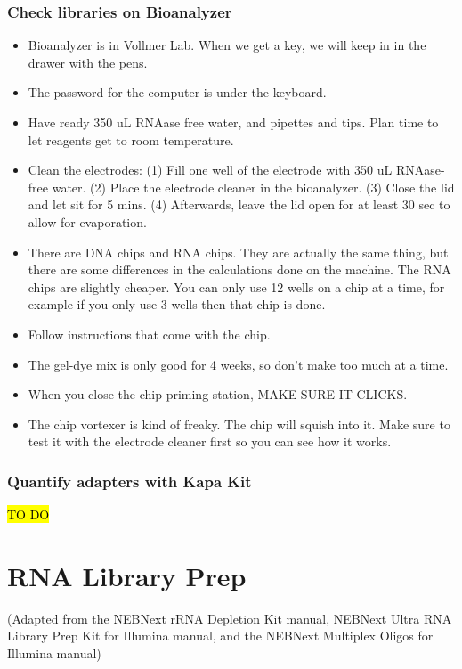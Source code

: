 \documentclass[11pt, oneside]{article}
\begin{document}
\subsubsection{Check libraries on Bioanalyzer}
	\begin{itemize}
		\item Bioanalyzer is in Vollmer Lab.  When we get a key, we will keep in in the drawer with the pens.
		\item The password for the computer is under the keyboard.
		\item Have ready 350 uL RNAase free water, and pipettes and tips.  Plan time to let reagents get to room temperature.
		\item Clean the electrodes: (1) Fill one well of the electrode with 350 uL RNAase-free water. (2) Place the electrode cleaner in the bioanalyzer. (3) Close the lid and let sit for 5 mins. (4) Afterwards, leave the lid open for at least 30 sec to allow for evaporation.
		\item There are DNA chips and RNA chips. They are actually the same thing, but there are some differences in the calculations done on the machine.  The RNA chips are slightly cheaper.  You can only use 12 wells on a chip at a time, for example if you only use 3 wells then that chip is done.
		\item Follow instructions that come with the chip.
		\item	The gel-dye mix is only good for 4 weeks, so don't make too much at a time.
		\item When you close the chip priming station, MAKE SURE IT CLICKS.
		\item The chip vortexer is kind of freaky.  The chip will squish into it. Make sure to test it with the electrode cleaner first so you can see how it works.
	\end{itemize}

\subsubsection{Quantify adapters with Kapa Kit}
	\hl{TO DO}					

\clearpage
\newpage
\section{RNA Library Prep}

	\noindent (Adapted from the NEBNext rRNA Depletion Kit manual, NEBNext Ultra RNA Library Prep Kit for Illumina manual, and the NEBNext Multiplex Oligos for Illumina manual)
	
\end{document}
